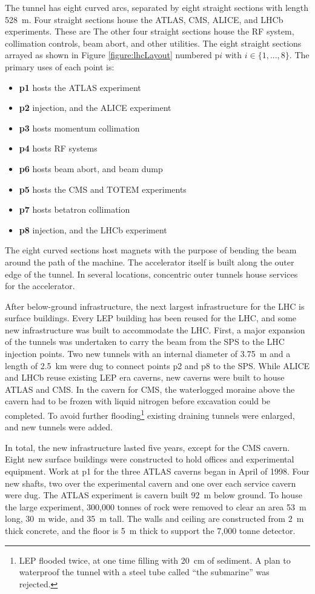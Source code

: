 The tunnel has eight curved arcs, separated by eight straight sections with length 528~m. \cite{lyndon}
Four straight sections house the ATLAS, CMS, ALICE, and LHCb experiments. These are 
The other four straight sections house the RF system, collimation controls, beam abort, and other utilities.
The eight straight sections arrayed as shown in Figure \ref{figure:lhcLayout} numbered p$i$ with $i\in\{1,...,8\}$.
The primary uses of each point is:
\begin{itemize}
    \item \textbf{p1} hosts the ATLAS experiment
    \item \textbf{p2} injection, and the ALICE experiment
    \item \textbf{p3} hosts momentum collimation
    \item \textbf{p4} hosts RF systems
    \item \textbf{p6} hosts beam abort, and beam dump
    \item \textbf{p5} hosts the CMS and TOTEM experiments
    \item \textbf{p7} hosts betatron collimation
    \item \textbf{p8} injection, and the LHCb experiment
\end{itemize}
The eight curved sections host magnets with the purpose of bending the beam around the path of the machine.
The accelerator itself is built along the outer edge of the tunnel. In several locations, concentric outer tunnels house services for the accelerator.

After below-ground infrastructure, the next largest infrastructure for the LHC is surface buildings.
Every LEP building has been reused for the LHC, and some new infrastructure was built to accommodate the LHC.
First, a major expansion of the tunnels was undertaken to carry the beam from the SPS to the LHC injection points. Two new tunnels with an internal diameter of 3.75~m and a length of 2.5~km were dug to connect points p2 and p8 to the SPS.
While ALICE and LHCb reuse existing LEP era caverns, new caverns were built to house ATLAS and CMS.
In the cavern for CMS, the waterlogged moraine above the cavern had to be frozen with liquid nitrogen before excavation could be completed.
To avoid further flooding\footnote{LEP flooded twice, at one time filling with 20~cm of sediment. A plan to waterproof the tunnel with a steel tube called ``the submarine'' was rejected.} existing draining tunnels were enlarged, and new tunnels were added.

In total, the new infrastructure lasted five years, except for the CMS cavern.
Eight new surface buildings were constructed to hold offices and experimental equipment. 
Work at p1 for the three ATLAS caverns began in April of 1998.\cite{lhcDesignV2}
Four new shafts, two over the experimental cavern and one over each service cavern were dug.
The ATLAS experiment is cavern built 92~m below ground. 
To house the large experiment, 300,000 tonnes of rock were removed to clear an area 53~m long, 30~m wide, and 35~m tall.
The walls and ceiling are constructed from 2~m thick concrete, and the floor is 5~m thick to support the 7,000 tonne detector. \cite{atlasFacts}


